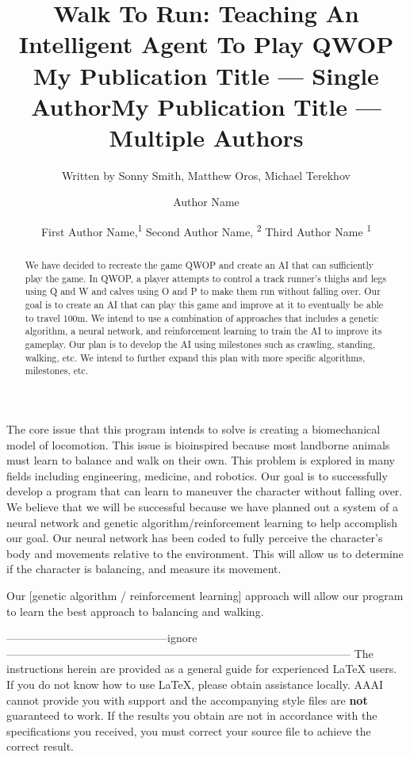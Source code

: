 \documentclass[letterpaper]{article} %
\title{Walk To Run: Teaching An  Intelligent Agent To Play QWOP }
\author{
    Written by Sonny Smith, Matthew Oros, Michael Terekhov
    \\
}
\title{My Publication Title --- Single Author}
\author {
    Author Name \\
}
\title{My Publication Title --- Multiple Authors}
\author {
    First Author Name,\textsuperscript{\rm 1}
    Second Author Name, \textsuperscript{\rm 2}
    Third Author Name \textsuperscript{\rm 1} \\
}
\begin{document}
\maketitle

\begin{abstract}
We have decided to recreate the game QWOP and create an AI that can sufficiently play the game. In QWOP, a player attempts to control a track runner’s thighs and legs using Q and W and calves using O and P to make them run without falling over. Our goal is to create an AI that can play this game and improve at it to eventually be able to travel 100m. We intend to use a combination of approaches that includes a genetic algorithm, a neural network, and reinforcement learning to train the AI to improve its gameplay. Our plan is to develop the AI using milestones such as crawling, standing, walking, etc. We intend to further expand this plan with more specific algorithms, milestones, etc.
\end{abstract}

\noindent The core issue that this program intends to solve is creating a biomechanical model of locomotion. This issue is bioinspired because most landborne animals must learn to balance and walk on their own. This problem is explored in many fields including engineering, medicine, and robotics. Our goal is to successfully develop a program that can learn to maneuver the character without falling over. We believe that we will be successful because we have planned out a system of a neural network and genetic algorithm/reinforcement learning to help accomplish our goal. Our neural network has been coded to fully perceive the character's body and movements relative to the environment. This will allow us to determine if the character is balancing, and measure its movement. 

Our [genetic algorithm / reinforcement learning] approach will allow our program to learn the best approach to balancing and walking.



--------------------------------------------ignore ---------------------------------------------------------------------------------------------
The instructions herein are provided as a general guide for experienced \LaTeX{} users. If you do not know how to use \LaTeX{}, please obtain assistance locally. AAAI cannot provide you with support and the accompanying style files are \textbf{not} guaranteed to work. If the results you obtain are not in accordance with the specifications you received, you must correct your source file to achieve the correct result.
\end{document}
